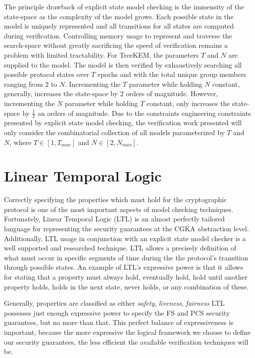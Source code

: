 The principle drawback of explicit state model checking is the immensity of the state-space as the complexity of the model grows.
Each possible state in the model is uniquely represented and all transitions for all states are computed during verification.
Controlling memory usage to represent and traverse the search-space without greatly sacrificing the speed of verification remains a problem with limited tractability.
For TreeKEM, the parameters \(T\) and \(N\) are supplied to the model.
The model is then verified by exhaustively searching all possible protocol states over \(T\) epochs and with the total unique group members ranging from \(2\) to \(N\).
Incrementing the \(T\) parameter while holding \(N\) constant, generally, increases the state-space by \(2\) orders of magnitude.
However, incrementing the \(N\) parameter while holding \(T\) constant, only increases the state-space by \(\frac{1}{2}\) an orders of magnitude.
Due to the constraints engineering constraints presented by explicit state model checking, the verification work presented will only consider the combinatorial collection of all models parameterized by \(T\) and \(N\), where \(T \in [1, T_{max}]\) and \(N \in [2, N_{max}]\).

\hypertarget{linear-temporal-logic}{%
\section{Linear Temporal Logic}\label{linear-temporal-logic}}

Correctly specifying the properties which must hold for the cryptographic protocol is one of the most important aspects of model checking techniques.
Fortunately, Linear Temporal Logic (LTL) \autocite{4567924} is an almost perfectly tailored language for representing the security guarantees at the CGKA abstraction level.
Additionally, LTL usage in conjunction with an explicit state model checker is a well supported and researched technique.
LTL allows a precisely definition of what must occur in specific segments of time during the the protocol's transition through possible states.
An example of LTL's expressive power is that it allows for stating that a property must always hold, eventually hold, hold until another property holds, holds in the next state, never holds, or any combination of these.

Generally, properties are classified as either \emph{safety}, \emph{liveness}, \emph{fairness}
LTL possesses just enough expressive power to specify the FS and PCS security guarantees, but no more than that.
This perfect balance of expressiveness is important, because the more expressive the logical framework we choose to define our security guarantees, the less efficient the available verification techniques will be.


